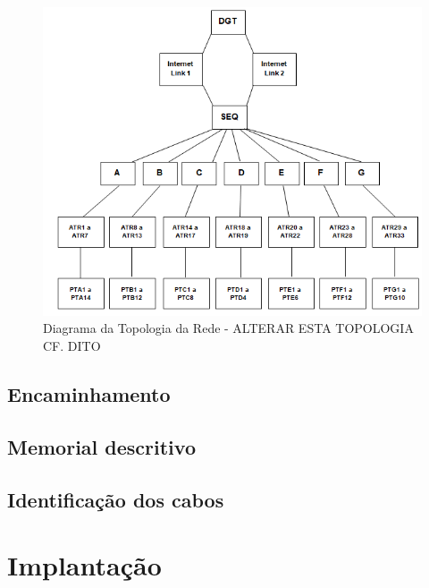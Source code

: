 \documentclass[	DIV=calc,%
							paper=a4,%
							fontsize=12pt,%
							onecolumn]{scrartcl}	 					%
\begin{document}
%
\begin{figure}[h!]
	\centering
	\includegraphics[width=\textwidth]{figura7.png}
	\caption[Diagrama da Topologia da Rede]{Diagrama da Topologia da Rede - ALTERAR ESTA TOPOLOGIA CF. DITO}
	\label{fig:figura7}
\end{figure}

\subsection{Encaminhamento}

\subsection{Memorial descritivo}


\subsection{Identificação dos cabos}

\section{Implantação}
\end{document}
